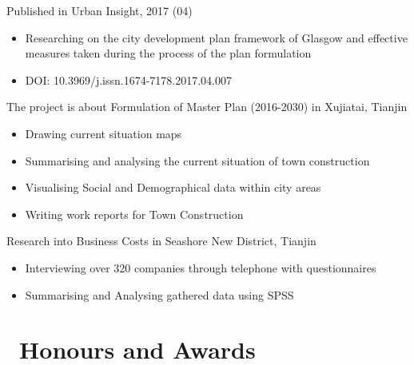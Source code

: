 \documentclass{resume}
\begin{document}
Published in Urban Insight, 2017 (04)
\begin{itemize}
	\item Researching on the city development plan framework of Glasgow and effective measures taken during the process of the plan formulation
	\item DOI: 10.3969/j.issn.1674-7178.2017.04.007
\end{itemize}

The project is about Formulation of Master Plan (2016-2030) in Xujiatai, Tianjin
\begin{itemize}
	\item Drawing current situation maps
	\item Summarising and analysing the current situation of town construction
\end{itemize}

\begin{itemize}
	\item Visualising Social and Demographical data within city areas
	\item Writing work reports for Town Construction
\end{itemize}

Research into Business Costs in Seashore New District, Tianjin
\begin{itemize}
	\item Interviewing over 320 companies through telephone with questionnaires
	\item Summarising and Analysing gathered data using SPSS
\end{itemize}

\section{\faHeartO\ Honours and Awards}
\end{document}

